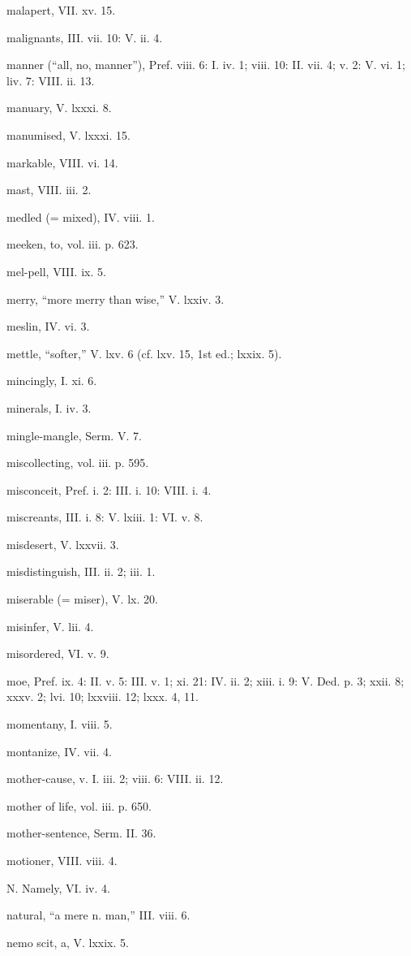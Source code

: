 malapert, VII. xv. 15.

malignants, III. vii. 10: V. ii. 4.

manner (“all, no, manner”), Pref. viii. 6: I. iv. 1; viii. 10: II. vii. 4; v. 2: V. vi. 1; liv. 7: VIII. ii. 13.

manuary, V. lxxxi. 8.

manumised, V. lxxxi. 15.

markable, VIII. vi. 14.

mast, VIII. iii. 2.

medled (= mixed), IV. viii. 1.

meeken, to, vol. iii. p. 623.

mel-pell, VIII. ix. 5.

merry, “more merry than wise,” V. lxxiv. 3.

meslin, IV. vi. 3.

mettle, “softer,” V. lxv. 6 (cf. lxv. 15, 1st ed.; lxxix. 5).

mincingly, I. xi. 6.

minerals, I. iv. 3.

mingle-mangle, Serm. V. 7.

miscollecting, vol. iii. p. 595.

misconceit, Pref. i. 2: III. i. 10: VIII. i. 4.

miscreants, III. i. 8: V. lxiii. 1: VI. v. 8.

misdesert, V. lxxvii. 3.

misdistinguish, III. ii. 2; iii. 1.

miserable (= miser), V. lx. 20.

misinfer, V. lii. 4.

misordered, VI. v. 9.

moe, Pref. ix. 4: II. v. 5: III. v. 1; xi. 21: IV. ii. 2; xiii. i. 9: V. Ded. p. 3; xxii. 8; xxxv. 2; lvi. 10; lxxviii. 12; lxxx. 4, 11.

momentany, I. viii. 5.

montanize, IV. vii. 4.

mother-cause, v. I. iii. 2; viii. 6: VIII. ii. 12.

mother of life, vol. iii. p. 650.

mother-sentence, Serm. II. 36.

motioner, VIII. viii. 4.

N.
Namely, VI. iv. 4.

natural, “a mere n. man,” III. viii. 6.

nemo scit, a, V. lxxix. 5.


